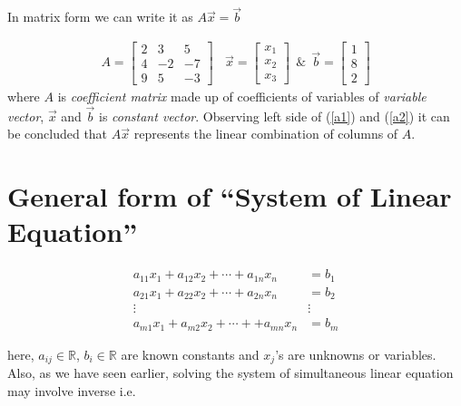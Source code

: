 \documentclass{article}
\begin{document}
    In matrix form we can write it as $A\vec{x} = \vec{b}$
    
    \begin{align}
        A = \begin{bmatrix}
                2 & 3 & 5 \\
                4 & -2 & -7 \\
                9 & 5 & -3
            \end{bmatrix} ~~~~ \vec{x} = \begin{bmatrix}
                                            x_1 \\
                                            x_2 \\
                                            x_3
                                         \end{bmatrix} ~~ \& ~~ \vec{b} = \begin{bmatrix}
                                            1 \\
                                            8 \\
                                            2
                                         \end{bmatrix} \nonumber
    \end{align}
where $A$ is \textit{coefficient matrix} made up of coefficients of variables of \textit{variable vector}, $\vec{x}$ and $\vec{b}$ is \textit{constant vector}. Observing left side of (\ref{a1}) and (\ref{a2}) it can be concluded that $A\vec{x}$ represents the linear combination of columns of $A$.\\
    
\section{General form of ``System of Linear Equation''}
\begin{align}
    a_{11}x_1 + a_{12}x_2 + \cdots + a_{1n}x_n &= b_1 \nonumber\\
    a_{21}x_1 + a_{22}x_2 + \cdots + a_{2n}x_n &= b_2 \nonumber\\
    \vdots     ~~~~~~~~~~~~~~~~~~~~~~          & \vdots\nonumber\\
    a_{m1}x_1 + a_{m2}x_2 + \cdots+ + a_{mn}x_n &= b_m \nonumber
\end{align}

here, $a_{ij} \in \mathbb{R}$, $b_{i} \in \mathbb{R}$ are known constants and $x_j$'s are unknowns or variables. Also, as we have seen earlier, solving the system of simultaneous linear equation may involve inverse i.e.
\end{document}
